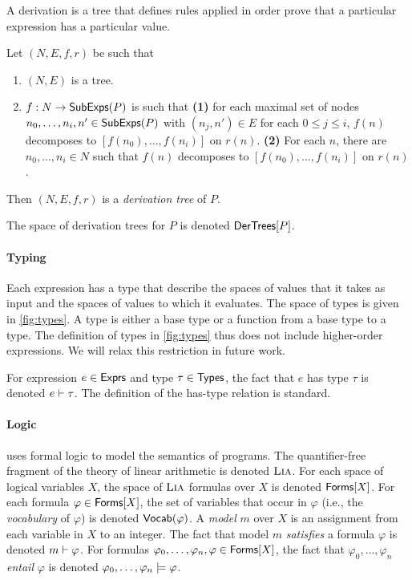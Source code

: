 % 
A derivation is a tree that defines rules applied in order prove that
a particular expression has a particular value.
%
\begin{defn}
  Let $(N, E, f, r)$ be such that
  \begin{enumerate}
  \item 
    $(N, E)$ is a tree.
  \item $f: N \to \mathsf{SubExps}(P)$ is such that \textbf{(1)} for each
    maximal set of nodes $n_0, \ldots, n_i, n' \in \mathsf{SubExps}(P)$ with
    $(n_j, n') \in E$ for each $0 \leq j \leq i$, $f(n)$ decomposes to
    $[ f(n_0), \ldots, f(n_i) ]$ on $r(n)$.
    \textbf{(2)} For each $n$, there are $n_0, \ldots, n_i \in N$ such
    that $f(n)$ decomposes to $[ f(n_0), \ldots, f(n_i) ]$ on $r(n)$.
  \end{enumerate}
  Then $(N, E, f, r)$ is a \emph{derivation tree} of $P$.
\end{defn}
%
The space of derivation trees for $P$ is denoted $\mathsf{DerTrees}[ P ]$.
%
%
%
%
%

\paragraph{Typing}
%
Each expression has a type that describe the spaces of values that it
takes as input and the spaces of values to which it evaluates.
%
The space of types is given in \autoref{fig:types}.
%
A type is either a base type or a function from a base type to a type.
%
The definition of types in \autoref{fig:types} thus does not include
higher-order expressions.
%
We will relax this restriction in future work.
%

For expression $e \in \mathsf{Exprs}$ and type $\tau \in \mathsf{Types}$, the fact that
$e$ has type $\tau$ is denoted $e \vdash \tau$.
%
The definition of the has-type relation is standard.

\paragraph{Logic}
%
\sys uses formal logic to model the semantics of programs.
%
The quantifier-free fragment of the theory of linear arithmetic is
denoted $\textsc{Lia}$.
%
For each space of logical variables $X$, the space of $\textsc{Lia}$ formulas
over $X$ is denoted $\mathsf{Forms}[ X ]$.
%
For each formula $\varphi \in \mathsf{Forms}[ X ]$, the set of variables that
occur in $\varphi$ (i.e., the \emph{vocabulary} of $\varphi$) is
denoted $\mathsf{Vocab}(\varphi)$.
A \lia \emph{model} $m$ over $X$ is an assignment from each variable
in $X$ to an integer.
%
The fact that model $m$ \emph{satisfies} a formula $\varphi$ is
denoted $m \vdash \varphi$.
%
For formulas $\varphi_0, \ldots, \varphi_n, \varphi \in \mathsf{Forms}[ X ]$,
the fact that $\varphi_0, \ldots, \varphi_n$ \emph{entail} $\varphi$
is denoted $\varphi_0, \ldots, \varphi_n \models \varphi$.

